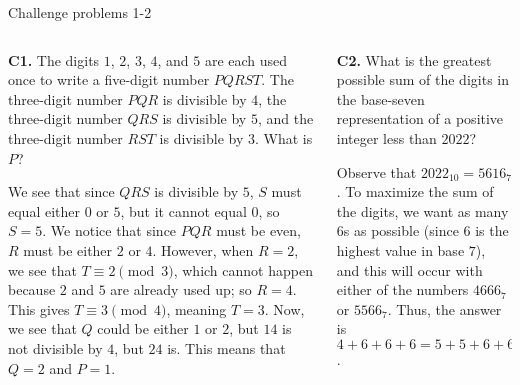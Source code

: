 \documentclass[9pt,aspectratio=169]{beamer}
\begin{document}
\begin{frame}{Challenge problems 1-2}
  \begin{columns}[T]
    \begin{column}{0.5\textwidth}
      \begin{problem}
        \textbf{C1.} The digits $1$, $2$, $3$, $4$, and $5$ are each used once to write a five-digit number $PQRST$. The three-digit number $PQR$ is divisible by $4$, the three-digit number $QRS$ is divisible by $5$, and the three-digit number $RST$ is divisible by $3$. What is $P$?
      \end{problem}
      We see that since $QRS$ is divisible by $5$, $S$ must equal either $0$ or $5$, but it cannot equal $0$, so $S=5$. We notice that since $PQR$ must be even, $R$ must be either $2$ or $4$. However, when $R=2$, we see that $T \equiv 2 \pmod{3}$, which cannot happen because $2$ and $5$ are already used up; so $R=4$. This gives $T \equiv 3 \pmod{4}$, meaning $T=3$. Now, we see that $Q$ could be either $1$ or $2$, but $14$ is not divisible by $4$, but $24$ is. This means that $Q=2$ and $P=\boxed{1}$.
    \end{column}
    \begin{column}{0.5\textwidth}
      \begin{problem}
        \textbf{C2.} What is the greatest possible sum of the digits in the base-seven representation of a positive integer less than $2022$?
      \end{problem}
      Observe that $2022_{10} = 5616_7$. To maximize the sum of the digits, we want as many $6$s as possible (since $6$ is the highest value in base $7$), and this will occur with either of the numbers $4666_7$ or $5566_7$. Thus, the answer is $4+6+6+6 = 5+5+6+6 = \boxed{22}$.
    \end{column}
  \end{columns}
\end{frame}
\end{document}
